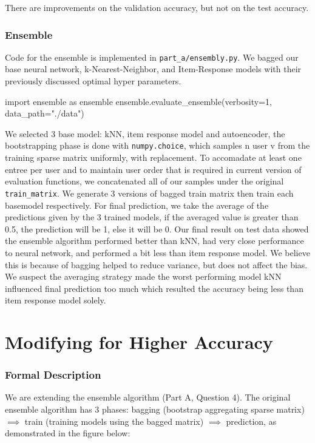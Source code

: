 \documentclass{article}
\begin{document}
    There are improvements on the validation accuracy, but not on the test accuracy.


    \pagebreak

    \section{Ensemble}
    Code for the ensemble is implemented in \verb|part_a/ensembly.py|. We bagged our base neural network, k-Nearest-Neighbor, and Item-Response models with their previously discussed optimal hyper parameters.

    \begin{pylabblock}[ENSEMBLE]
        import ensemble as ensemble
        ensemble.evaluate_ensemble(verbosity=1, data_path="./data")
    \end{pylabblock}
    \printpythontex[verb]

    We selected 3 base model: kNN, item response model and autoencoder, the bootstrapping phase is done with \verb|numpy.choice|, which samples n user v from the training sparse matrix uniformly, with replacement. To accomadate at least one entree per user and to maintain user order that is required in current version of evaluation functions, we concatenated all of our samples under the original \verb|train_matrix|. We generate 3 versions of bagged train matrix then train each basemodel respectively. For final prediction, we take the average of the predictions given by the 3 trained models, if the averaged value is greater than 0.5, the prediction will be 1, else it will be 0. Our final result on test data showed the ensemble algorithm performed better than kNN, had very close performance to neural network, and performed a bit less than item response model. We believe this is because of bagging helped to reduce variance, but does not affect the bias. We suspect the averaging strategy made the worst performing model kNN influenced final prediction too much which resulted the accuracy being less than item response model solely.

    \pagebreak

    \part{Modifying for Higher Accuracy}
    \section{Formal Description}
    We are extending the ensemble algorithm (Part A, Question 4). The original ensemble algorithm has 3 phases: bagging (bootstrap aggregating sparse matrix) $\implies$ train (training models using the bagged matrix) $\implies$ prediction, as demonstrated in the figure below:
\end{document}
